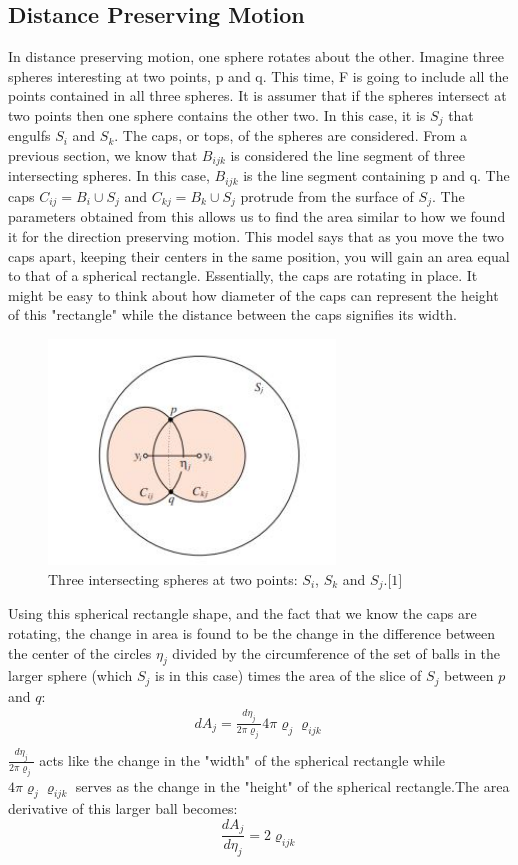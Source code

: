 \documentclass{article}
\begin{document}
\subsection{Distance Preserving Motion}
In distance preserving motion, one sphere rotates about the other. Imagine three spheres interesting at two points, p and q. This time, F is going to include all the points contained in all three spheres. It is assumer that if the spheres intersect at two points then one sphere contains the other two. In this case, it is $S_j$ that engulfs $S_i$ and $S_k$. The caps, or tops, of the spheres are considered. From a previous section, we know that $B_{ijk}$ is considered the line segment of three intersecting spheres. In this case, $B_{ijk}$ is the line segment containing p and q. The caps $C_{ij} = B_i \cup S_j$ and $C_{kj} = B_k \cup S_j$ protrude from the surface of $S_j$. The parameters obtained from this allows us to find the area similar to how we found it for the direction preserving motion. This model says that as you move the two caps apart, keeping their centers in the same position, you will gain an area equal to that of a spherical rectangle. Essentially, the caps are rotating in place. It might be easy to think about how diameter of the caps can represent the height of this "rectangle" while the distance between the caps signifies its width.
\begin{figure}[h!]
\caption{Three intersecting spheres at two points: $S_i$, $S_k$ and $S_j.\lbrack1\rbrack$}
\centerline{\includegraphics[width=3in]{Figure7}}
\end{figure}

Using this spherical rectangle shape, and the fact that we know the caps are rotating, the change in area is found to be the change in the difference between the center of the circles $\eta_j$ divided by the circumference of the set of balls in the larger sphere (which $S_j$ is in this case) times the area of the slice of $S_j$ between $p$ and $q$: 
\begin{align}
dA_j = \frac{d\eta_j}{2\pi\varrho_j}4\pi\varrho_j\varrho_{ijk}\\
\end{align}
$\frac{d\eta_j}{2\pi\varrho_j}$ acts like the change in the "width" of the spherical rectangle while $4\pi\varrho_j\varrho_{ijk}$ serves as the change in the "height" of the spherical rectangle.The area derivative of this larger ball becomes:
\begin{equation*}
\frac{dA_j}{d\eta_j }= 2\varrho_{ijk}
\end{equation*}
\end{document}
